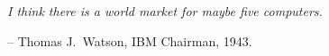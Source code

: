 \providecommand{\main}{..}



\begin{quotepage}
 \vspace*{1in}
 \begin{center}
	\emph{I think there is a world market for maybe five computers.}
	\begin{flushright}
		-- Thomas J.\ Watson, IBM Chairman, 1943.
	\end{flushright}
 \end{center}
\end{quotepage}

